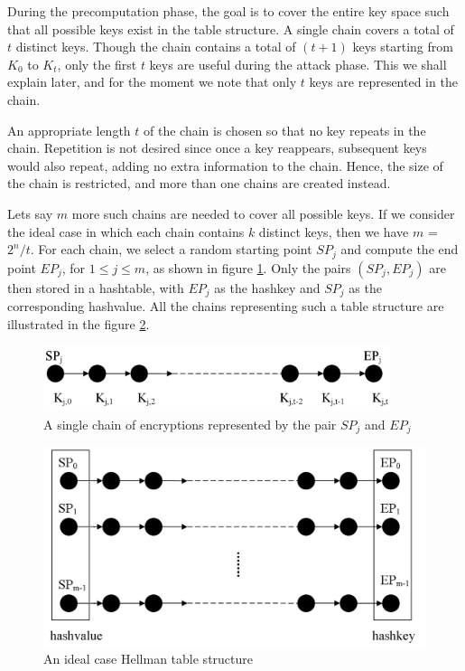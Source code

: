 During the precomputation phase, the goal is to cover the entire key space such that all possible keys exist in the table structure. A single chain covers a total of $t$ distinct keys. Though the chain contains a total of $(t+1)$ keys starting from $K_0$ to $K_{t}$, only the first $t$ keys are useful during the attack phase. This we shall explain later, and for the moment we note that only $t$ keys are represented in the chain.

An appropriate length $t$ of the chain is chosen so that no key repeats in the chain. Repetition is not desired since once a key reappears, subsequent keys would also repeat, adding no extra information to the chain. Hence, the size of the chain is restricted, and more than one chains are created instead. 

Lets say $m$ more such chains are needed to cover all possible keys. If we consider the ideal case in which each chain contains $k$ distinct keys, then we have $m$ = $2^n/t$. For each chain, we select a random starting point $SP_j$ and compute the end point $EP_j$, for $1 \leq j \leq m$, as shown in figure \ref{fig:single-chain}. Only the pairs $(SP_j,EP_j)$ are then stored in a hashtable, with $EP_j$ as the hashkey and $SP_j$ as the corresponding hashvalue. All the chains representing such a table structure are illustrated in the figure \ref{fig:naive-hellman-table}.

\begin{figure}[ht!]
	\centering
		\includegraphics[width=4in]{./figures/single-chain.PNG}
	\caption{A single chain of encryptions represented by the pair $SP_j$ and $EP_j$}	
	\label{fig:single-chain}
\end{figure}

\begin{figure}[ht!]
	\centering
		\includegraphics[width=4.5in]{./figures/naive-hellman-table.PNG}
	\caption{An ideal case Hellman table structure}	
	\label{fig:naive-hellman-table}
\end{figure}

